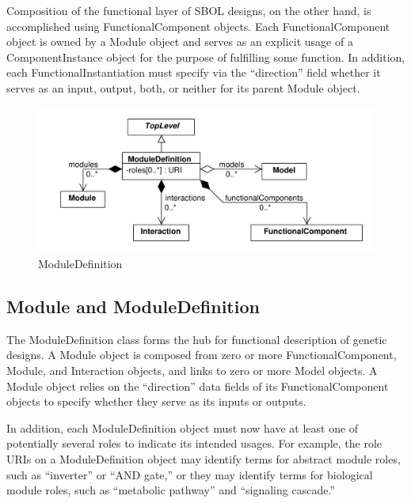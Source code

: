 \documentclass[draftspec]{sbmlpkgspec}
\begin{document}
Composition of the functional layer of SBOL designs, on the other hand, is accomplished using FunctionalComponent objects. Each FunctionalComponent object is owned by a Module object and serves as an explicit usage of a ComponentInstance object for the purpose of fulfilling some function. In addition, each FunctionalInstantiation must specify via the “direction” field whether it serves as an  input, output, both, or neither for its parent Module object. 

\begin{figure}[h]
\begin{center}
\includegraphics[width=\textwidth]{uml/module_definition}
\caption[]{ModuleDefinition}
\label{uml:module_definition}
\end{center}
\end{figure}

\subsection{Module and ModuleDefinition}

The ModuleDefinition class forms the hub for functional description of genetic designs. A Module object is composed from zero or more FunctionalComponent, Module, and Interaction objects, and links to zero or more Model objects. A Module object relies on the “direction” data fields of its FunctionalComponent objects to specify whether they serve as its inputs or outputs.

In addition, each ModuleDefinition object must now have at least one of potentially several roles to indicate its intended usages. For example, the role URIs on a ModuleDefinition object may identify terms for abstract module roles, such as “inverter” or “AND gate,” or they may identify terms for biological module roles, such as “metabolic pathway” and “signaling cascade.”
\end{document}
